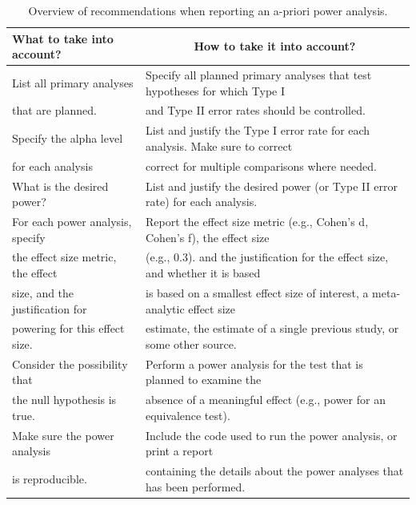 \documentclass[
  english,
  ,jou, a4paper,floatsintext]{apa6}
\begin{document}
\begin{table}[tbp]

\begin{center}
\begin{threeparttable}

\caption{\label{tab:table-pow-rec-2}Overview of recommendations when reporting an a-priori power analysis.}

\begin{tabular}{ll}
\toprule
What to take into account? & \multicolumn{1}{c}{How to take it into account?}\\
\midrule
List all primary analyses & Specify all planned primary analyses that test hypotheses for which Type I\\
that are planned. & and Type II error rates should be controlled.\\ \midrule
Specify the alpha level & List and justify the Type I error rate for each analysis. Make sure to correct\\
for each analysis & correct for multiple comparisons where needed.\\ \midrule
What is the desired power? & List and justify the desired power (or Type II error rate) for each analysis.\\ \midrule
For each power analysis, specify & Report the effect size metric (e.g., Cohen's d, Cohen's f), the effect size\\
the effect size metric, the effect & (e.g., 0.3). and the justification for the effect size, and whether it is based\\
size, and the justification for & is based on a smallest effect size of interest, a meta-analytic effect size\\
powering for this effect size. & estimate, the estimate of a single previous study, or some other source.\\ \midrule
Consider the possibility that & Perform a power analysis for the test that is planned to examine the\\
the null hypothesis is true. & absence of a meaningful effect (e.g., power for an equivalence test).\\ \midrule
Make sure the power analysis & Include the code used to run the power analysis, or print a report\\
is reproducible. & containing the details about the power analyses that has been performed.\\
\bottomrule
\end{tabular}

\end{threeparttable}
\end{center}

\end{table}
\end{document}

